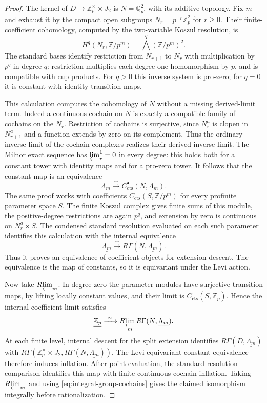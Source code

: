 \documentclass[11pt]{article}
\numberwithin{equation}{section}
\theoremstyle{definition}
\theoremstyle{remark}
\newcommand{\Q}{\mathbb Q}
\newcommand{\Z}{\mathbb Z}
\newcommand{\cts}{\mathrm{cts}}
\newcommand{\Rlim}{R\!\varprojlim}
\begin{document}
\begin{proof}
The kernel of $D\to\Z_p^\times\times J_2$ is
$N=\Q_p^2$, with its additive topology.
Fix $m$ and exhaust it by the compact open subgroups
$N_r=p^{-r}\Z_p^2$ for $r\geq0$.  Their finite-coefficient
cohomology, computed by the two-variable Koszul resolution, is
\[
 H^q(N_r,\Z/p^m)=\bigwedge^q(\Z/p^m)^2.
\]
The standard bases identify restriction from $N_{r+1}$ to $N_r$
with multiplication by $p^q$ in degree $q$: restriction multiplies
each degree-one homomorphism by $p$, and is compatible with cup
products.  For $q>0$ this inverse system is pro-zero; for $q=0$
it is constant with identity transition maps.

This calculation computes the cohomology of $N$ without a missing
derived-limit term.  Indeed a continuous cochain on $N$ is exactly
a compatible family of cochains on the $N_r$.
Restriction of cochains is surjective, since $N_r^a$ is clopen in
$N_{r+1}^a$ and a function extends by zero on its complement.
Thus the ordinary inverse limit of the cochain complexes realizes
their derived inverse limit.  The Milnor exact sequence has
$\varprojlim^1_r=0$ in every degree: this holds both for a constant
tower with identity maps and for a pro-zero tower.  It follows that
the constant map is an equivalence
\[
 \Lambda_m\xrightarrow{\ \sim\ }C_{\cts}^{\bullet}(N,\Lambda_m).
\]
The same proof works with coefficients
$C_{\cts}(S,\Z/p^m)$ for every profinite parameter space $S$.
The finite Koszul complex gives finite sums of this module, the
positive-degree restrictions are again $p^q$, and extension by
zero is continuous on $N_r^a\times S$.
The condensed standard resolution evaluated on each such parameter
identifies this calculation with the internal equivalence
\[
 \underline{\Lambda_m}\xrightarrow{\ \sim\ }
       R\Gamma(N,\underline{\Lambda_m}).
\]
Thus it proves an equivalence of coefficient objects for extension
descent.  The equivalence is the map of constants, so it is equivariant
under the Levi action.

Now take $\Rlim_m$.  In degree zero the parameter modules have
surjective transition maps, by lifting locally constant values,
and their limit is $C_{\cts}(S,\Z_p)$.
Hence the internal coefficient limit satisfies
\[
 \underline{\Z_p}\xrightarrow{\ \sim\ }
       \Rlim_m R\Gamma(N,\underline{\Lambda_m}).
\]
At each finite level, internal descent for the split extension identifies
$R\Gamma(D,\underline{\Lambda_m})$ with
$R\Gamma(\Z_p^\times\times J_2,
R\Gamma(N,\underline{\Lambda_m}))$.
The Levi-equivariant constant equivalence therefore induces inflation.
After point evaluation, the standard-resolution comparison identifies
this map with finite continuous-cochain inflation.  Taking $\Rlim_m$
and using \eqref{eq:integral-group-cochains} gives the claimed
isomorphism integrally before rationalization.


\end{proof}
\end{document}
